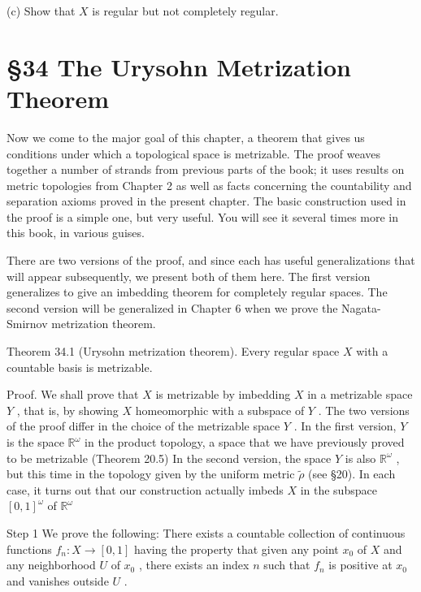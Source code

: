 \documentclass[10pt]{article}
\begin{document}
(c) Show that \(X\) is regular but not completely regular.

\section*{§34 The Urysohn Metrization Theorem}

Now we come to the major goal of this chapter, a theorem that gives us conditions under which a topological space is metrizable. The proof weaves together a number of strands from previous parts of the book; it uses results on metric topologies from Chapter 2 as well as facts concerning the countability and separation axioms proved in the present chapter. The basic construction used in the proof is a simple one, but very useful. You will see it several times more in this book, in various guises.

There are two versions of the proof, and since each has useful generalizations that will appear subsequently, we present both of them here. The first version generalizes to give an imbedding theorem for completely regular spaces. The second version will be generalized in Chapter 6 when we prove the Nagata-Smirnov metrization theorem.

Theorem 34.1 (Urysohn metrization theorem). Every regular space \(X\) with a countable basis is metrizable.

Proof. We shall prove that \(X\) is metrizable by imbedding \(X\) in a metrizable space \(Y\) , that is, by showing \(X\) homeomorphic with a subspace of \(Y\) . The two versions of the proof differ in the choice of the metrizable space \(Y\) . In the first version, \(Y\) is the space \({\mathbb{R}}^{\omega }\) in the product topology, a space that we have previously proved to be metrizable (Theorem 20.5) In the second version, the space \(Y\) is also \({\mathbb{R}}^{\omega }\) , but this time in the topology given by the uniform metric \(\widetilde{\rho }\) (see §20). In each case, it turns out that our construction actually imbeds \(X\) in the subspace \({\left\lbrack  0,1\right\rbrack  }^{\omega }\) of \({\mathbb{R}}^{\omega }\)

Step 1 We prove the following: There exists a countable collection of continuous functions \({f}_{n} : X \rightarrow  \left\lbrack  {0,1}\right\rbrack\) having the property that given any point \({x}_{0}\) of \(X\) and any neighborhood \(U\) of \({x}_{0}\) , there exists an index \(n\) such that \({f}_{n}\) is positive at \({x}_{0}\) and vanishes outside \(U\) .
\end{document}
